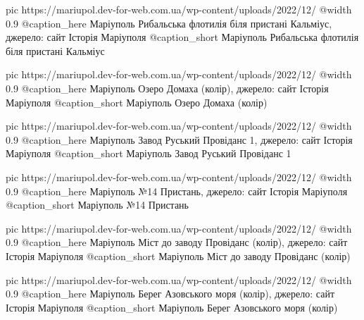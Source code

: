 	pic https://mariupol.dev-for-web.com.ua/wp-content/uploads/2022/12/%
	@width 0.9
	@caption_here Маріуполь Рибальська флотилія біля пристані Кальміус, джерело: сайт Історія Маріуполя
	@caption_short Маріуполь Рибальська флотилія біля пристані Кальміус

	pic https://mariupol.dev-for-web.com.ua/wp-content/uploads/2022/12/%
	@width 0.9
	@caption_here Маріуполь Озеро Домаха (колір), джерело: сайт Історія Маріуполя
	@caption_short Маріуполь Озеро Домаха (колір)

	pic https://mariupol.dev-for-web.com.ua/wp-content/uploads/2022/12/%
	@width 0.9
	@caption_here Маріуполь Завод Руський Провіданс 1, джерело: сайт Історія Маріуполя
	@caption_short Маріуполь Завод Руський Провіданс 1

	pic https://mariupol.dev-for-web.com.ua/wp-content/uploads/2022/12/%
	@width 0.9
	@caption_here Маріуполь №14 Пристань, джерело: сайт Історія Маріуполя
	@caption_short Маріуполь №14 Пристань

	pic https://mariupol.dev-for-web.com.ua/wp-content/uploads/2022/12/%
	@width 0.9
	@caption_here Маріуполь Міст до заводу Провіданс (колір), джерело: сайт Історія Маріуполя
	@caption_short Маріуполь Міст до заводу Провіданс (колір)

	pic https://mariupol.dev-for-web.com.ua/wp-content/uploads/2022/12/%
	@width 0.9
	@caption_here Маріуполь Берег Азовського моря (колір), джерело: сайт Історія Маріуполя
	@caption_short Маріуполь Берег Азовського моря (колір)

